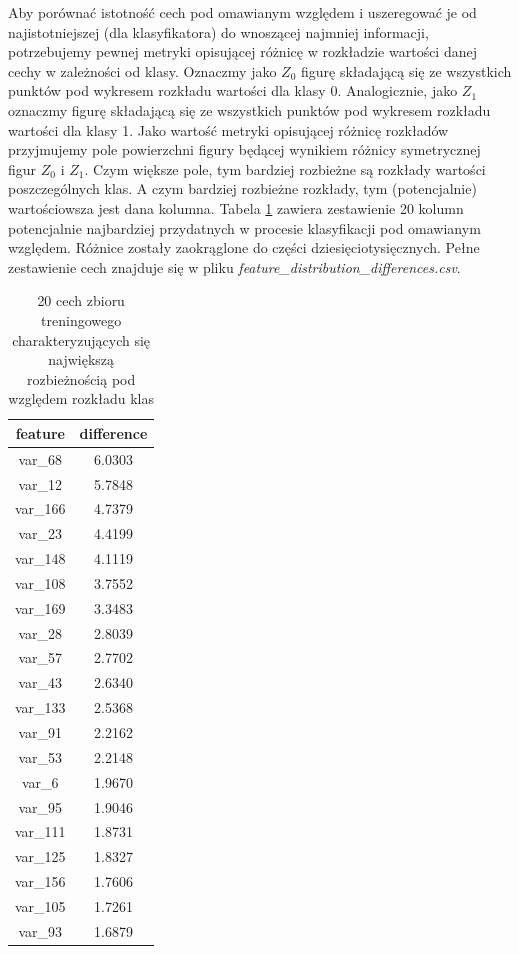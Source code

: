 \documentclass[12pt]{article}
\begin{document}
Aby porównać istotność cech pod omawianym względem i uszeregować je od najistotniejszej (dla klasyfikatora) do wnoszącej najmniej informacji, potrzebujemy pewnej metryki opisującej różnicę w rozkładzie wartości danej cechy w zależności od klasy.   
\newline Oznaczmy jako $Z_0$ figurę składającą się ze wszystkich punktów pod wykresem rozkładu wartości dla klasy 0. Analogicznie, jako $Z_1$ oznaczmy figurę składającą się ze wszystkich punktów pod wykresem rozkładu wartości dla klasy 1.
\newline Jako wartość metryki opisującej różnicę rozkładów przyjmujemy pole powierzchni figury będącej wynikiem różnicy symetrycznej figur $Z_0$ i $Z_1$. Czym większe pole, tym bardziej rozbieżne są rozkłady wartości poszczególnych klas. A czym bardziej rozbieżne rozkłady, tym (potencjalnie) wartościowsza jest dana kolumna.
\newline Tabela \ref{tab:my_label} zawiera zestawienie 20 kolumn potencjalnie najbardziej przydatnych w procesie klasyfikacji pod omawianym względem. Różnice zostały zaokrąglone do części dziesięciotysięcznych. Pełne zestawienie cech znajduje się w pliku \textit{feature\_distribution\_differences.csv}.

\begin{table}[H]
    \centering
    \begin{tabular}{|c|c|}
    \hline
    feature & difference \\
    \hline
    \hline
    var\_68 &	6.0303 \\
    \hline
    var\_12 &	5.7848 \\
    \hline
    var\_166 &	4.7379 \\
    \hline
    var\_23	& 4.4199 \\
    \hline
    var\_148	& 4.1119 \\
    \hline
    var\_108	& 3.7552 \\
    \hline
    var\_169	& 3.3483 \\
    \hline
    var\_28	& 2.8039 \\
    \hline
    var\_57	& 2.7702 \\
    \hline
    var\_43	& 2.6340 \\
    \hline
    var\_133	& 2.5368 \\
    \hline
    var\_91	& 2.2162 \\
    \hline
    var\_53	& 2.2148 \\
    \hline
    var\_6	& 1.9670 \\
    \hline
    var\_95	& 1.9046 \\
    \hline
    var\_111	& 1.8731 \\
    \hline
    var\_125	& 1.8327 \\
    \hline
    var\_156	& 1.7606 \\
    \hline
    var\_105	& 1.7261 \\
    \hline
    var\_93	& 1.6879 \\
    \hline
    \end{tabular}
    \caption{20 cech zbioru treningowego charakteryzujących się największą rozbieżnością pod względem rozkładu klas}
    \label{tab:my_label}
\end{table}
\end{document}
